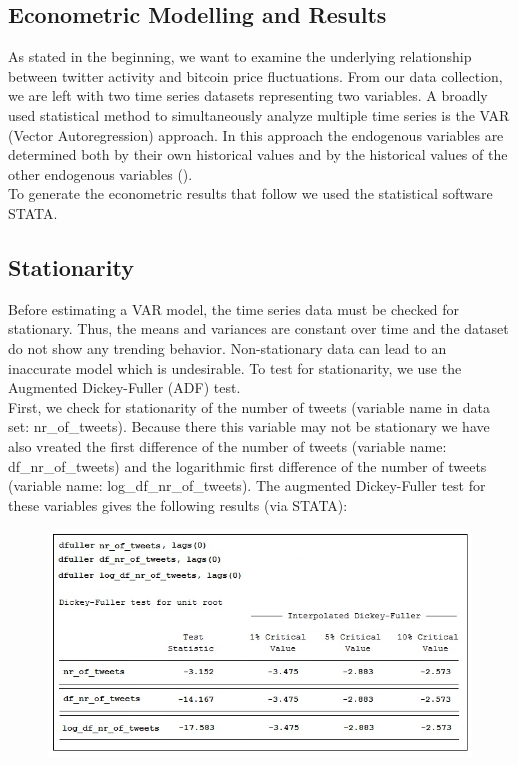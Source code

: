 \documentclass[a4paper,american,12pt]{article}
\begin{document}
\begin{spacing}{1.2}
\section{Econometric Modelling and Results}
\label{sec:EconometricModellingandResults}
As stated in the beginning, we want to examine the underlying relationship between twitter activity and bitcoin price fluctuations. From our data collection, we are left with two time series datasets representing two variables. A broadly used statistical method to simultaneously analyze multiple time series is the VAR (Vector Autoregression) approach. In this approach the endogenous variables are determined both by their own historical values and by the historical values of the other endogenous variables (\cite[pp.~4--5]{lütkepohl2007new}).\\
To generate the econometric results that follow we used the statistical software STATA.

\subsection{Stationarity}
Before estimating a VAR model, the time series data must be checked for stationary. Thus, the means and variances are constant over time and the dataset do not show any trending behavior. Non-stationary data can lead to an inaccurate model which is undesirable. To test for stationarity, we use the Augmented Dickey-Fuller (ADF) test.\\
First, we check for stationarity of the number of tweets (variable name in data set: nr\_of\_tweets). Because there this variable may not be stationary we have also vreated the first difference of the number of tweets (variable name: df\_nr\_of\_tweets) and the logarithmic first difference of the number of tweets (variable name: log\_df\_nr\_of\_tweets). The augmented Dickey-Fuller test for these variables gives the following results (via STATA):\\

\begin{figure}[H]
\centering
\graphicspath{ {stata_export_graphs/} }
\includegraphics[scale=0.85]{ADF_twitter_variables.png}
\end{figure}
	

\end{spacing}
\end{document}
